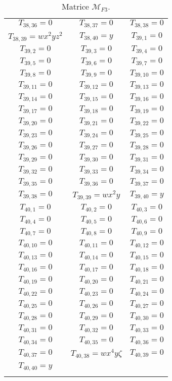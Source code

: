 \documentclass[12pt]{memoireuqam1.3}
\begin{document}
\begin{longtable}{|c|c|c|}
$T_{38,36}= 0$&
$T_{38,37}= 0$&
$T_{38,38}= 0$\\
$T_{38,39}= wx^2yz^2$&
$T_{38,40}= y$&
$T_{39,1}= 0$\\
$T_{39,2}= 0$&
$T_{39,3}= 0$&
$T_{39,4}= 0$\\
$T_{39,5}= 0$&
$T_{39,6}= 0$&
$T_{39,7}= 0$\\
$T_{39,8}= 0$&
$T_{39,9}= 0$&
$T_{39,10}= 0$\\
$T_{39,11}= 0$&
$T_{39,12}= 0$&
$T_{39,13}= 0$\\
$T_{39,14}= 0$&
$T_{39,15}= 0$&
$T_{39,16}= 0$\\
$T_{39,17}= 0$&
$T_{39,18}= 0$&
$T_{39,19}= 0$\\
$T_{39,20}= 0$&
$T_{39,21}= 0$&
$T_{39,22}= 0$\\
$T_{39,23}= 0$&
$T_{39,24}= 0$&
$T_{39,25}= 0$\\
$T_{39,26}= 0$&
$T_{39,27}= 0$&
$T_{39,28}= 0$\\
$T_{39,29}= 0$&
$T_{39,30}= 0$&
$T_{39,31}= 0$\\
$T_{39,32}= 0$&
$T_{39,33}= 0$&
$T_{39,34}= 0$\\
$T_{39,35}= 0$&
$T_{39,36}= 0$&
$T_{39,37}= 0$\\
$T_{39,38}= 0$&
$T_{39,39}= wx^2y$&
$T_{39,40}= y$\\
$T_{40,1}= 0$&
$T_{40,2}= 0$&
$T_{40,3}= 0$\\
$T_{40,4}= 0$&
$T_{40,5}= 0$&
$T_{40,6}= 0$\\
$T_{40,7}= 0$&
$T_{40,8}= 0$&
$T_{40,9}= 0$\\
$T_{40,10}= 0$&
$T_{40,11}= 0$&
$T_{40,12}= 0$\\
$T_{40,13}= 0$&
$T_{40,14}= 0$&
$T_{40,15}= 0$\\
$T_{40,16}= 0$&
$T_{40,17}= 0$&
$T_{40,18}= 0$\\
$T_{40,19}= 0$&
$T_{40,20}= 0$&
$T_{40,21}= 0$\\
$T_{40,22}= 0$&
$T_{40,23}= 0$&
$T_{40,24}= 0$\\
$T_{40,25}= 0$&
$T_{40,26}= 0$&
$T_{40,27}= 0$\\
$T_{40,28}= 0$&
$T_{40,29}= 0$&
$T_{40,30}= 0$\\
$T_{40,31}= 0$&
$T_{40,32}= 0$&
$T_{40,33}= 0$\\
$T_{40,34}= 0$&
$T_{40,35}= 0$&
$T_{40,36}= 0$\\
$T_{40,37}= 0$&
$T_{40,38}= wx^4y\zeta$&
$T_{40,39}= 0$\\
$T_{40,40}= y$&\\
\hline
\caption{\label{tab2} Matrice $\mathcal{M}_{F3}$.}
\end{longtable} 
\end{document}
